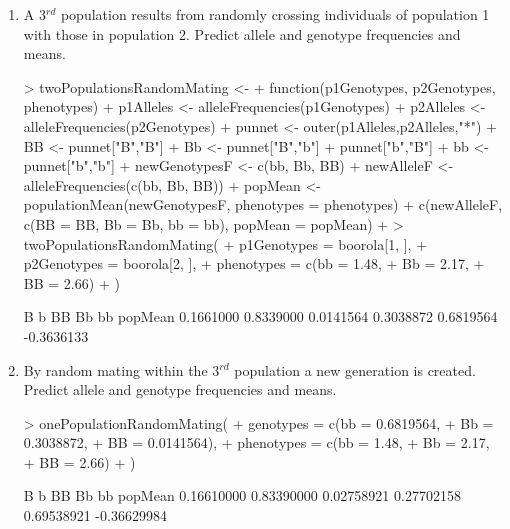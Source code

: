\documentclass[12pt,a4paper]{paper}
\begin{document}
\begin{enumerate}
\begin{enumerate}
\begin{Schunk}
\end{Schunk}
\item A 3$^{rd}$ population results from randomly crossing individuals of population 1 with those in population 2. Predict allele and genotype frequencies and means.
\begin{Schunk}
\begin{Sinput}
> twoPopulationsRandomMating <-
+   function(p1Genotypes, p2Genotypes, phenotypes) {
+   p1Alleles <- alleleFrequencies(p1Genotypes)
+   p2Alleles <- alleleFrequencies(p2Genotypes)
+   punnet <- outer(p1Alleles,p2Alleles,"*")
+   BB <- punnet["B","B"]
+   Bb <- punnet["B","b"] + punnet["b","B"]
+   bb <- punnet["b","b"]
+   newGenotypesF <- c(bb, Bb, BB)
+   newAlleleF <- alleleFrequencies(c(bb, Bb, BB))
+   popMean <- populationMean(newGenotypesF, phenotypes = phenotypes)
+   c(newAlleleF, c(BB = BB, Bb = Bb, bb = bb), popMean = popMean)
+   }
>   twoPopulationsRandomMating(
+   p1Genotypes = boorola[1, ],
+   p2Genotypes = boorola[2, ],
+   phenotypes = c(bb = 1.48,
+   Bb = 2.17,
+   BB = 2.66)
+   )
\end{Sinput}
\begin{Soutput}
         B          b         BB         Bb         bb    popMean 
 0.1661000  0.8339000  0.0141564  0.3038872  0.6819564 -0.3636133 
\end{Soutput}
\end{Schunk}
\item By random mating within the 3$^{rd}$ population a new generation is created. Predict allele and genotype frequencies and means.
\begin{Schunk}
\begin{Sinput}
> onePopulationRandomMating(
+   genotypes = c(bb = 0.6819564, 
+                 Bb = 0.3038872, 
+                 BB = 0.0141564),
+   phenotypes = c(bb = 1.48,
+   Bb = 2.17,
+   BB = 2.66)
+   )
\end{Sinput}
\begin{Soutput}
          B           b          BB          Bb          bb     popMean 
 0.16610000  0.83390000  0.02758921  0.27702158  0.69538921 -0.36629984 
\end{Soutput}
\end{Schunk}
\end{enumerate}
\end{enumerate}
\end{document}
